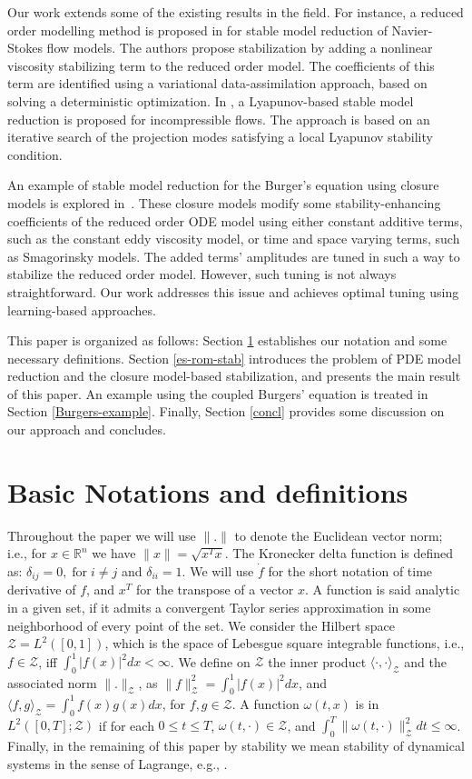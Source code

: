 \documentclass[letterpaper,conference,onecolumn,11pt]{IEEEtran}
\begin{document}
Our work extends some of the existing results in the field. For
instance, a reduced order modelling method is proposed in
\cite{CNTLDBDN13} for stable model reduction of Navier-Stokes flow
models. The authors propose stabilization by adding a nonlinear
viscosity stabilizing term to the reduced order model. The
coefficients of this term are identified using a variational
data-assimilation approach, based on solving a deterministic
optimization. In \cite{BDN13,B13}, a Lyapunov-based stable model
reduction is proposed for incompressible flows. The approach is
based on an iterative search of the projection modes satisfying a
local Lyapunov stability condition.

An example of stable model reduction for the Burger's equation
using closure models is explored in~\cite{SB14,SI13}. These
closure models modify some stability-enhancing coefficients of the
reduced order ODE model using either constant additive terms, such
as the constant eddy viscosity model, or time and space varying
terms, such as Smagorinsky models. The added terms' amplitudes are
tuned in such a way to stabilize the reduced order model. However,
such tuning is not always straightforward. Our work addresses this
issue and achieves optimal tuning using learning-based approaches.

This paper is organized as follows: Section \ref{prem} establishes our
notation and some necessary definitions. Section \ref{es-rom-stab}
introduces the problem of PDE model reduction and the closure
model-based stabilization, and presents the main result of this paper.
An example using the coupled Burgers' equation is treated in Section
\ref{Burgers-example}.  Finally, Section \ref{concl} provides some
discussion on our approach and concludes.

\section{Basic Notations and definitions}
\label{prem}
Throughout the paper we will use $\|.\|$ to denote the Euclidean
vector norm; i.e., for $x\in \mathbb{R}^n$ we have $\|x\|=\sqrt{x^T
  x}$. The Kronecker delta function is defined as:
$\delta_{ij}=0,\;\text{for}\;i\neq j$ and $\delta_{ii}=1$. We will
use $\dot{f}$ for the short notation of time derivative of $f$,
and $x^{T}$ for the transpose of a vector $x$. A function is said
analytic in a given set, if it admits a convergent Taylor series
approximation in some neighborhood of every point of the set. We
consider the Hilbert space $\mathcal{Z}=L^{2}([0,1])$, which is
the space of Lebesgue square integrable functions, i.e.,
$f\in\mathcal{Z}$, iff $\int_{0}^{1}|f(x)|^{2}dx<\infty$. We
define on $\mathcal{Z}$ the inner product $\langle
\cdot,\cdot\rangle _{\mathcal{Z}}$ and the associated norm
$\|.\|_{\mathcal{Z}}$, as
$\|f\|_{\mathcal{Z}}^{2}=\int_{0}^{1}|f(x)|^{2}dx$, and $\langle
f,g\rangle _{\mathcal{Z}}=\int_{0}^{1}f(x)g(x)dx$, for
$f,g\in\mathcal{Z}$. A function $\omega(t,x)$ is in
$L^{2}([0,T];\mathcal{Z})$ if for each $0\leq t\leq T$,
$\omega(t,\cdot)\in\mathcal{Z}$, and
$\int_{0}^{T}{\|\omega(t,\cdot)\|_\mathcal{Z}^2} dt\leq\infty$.
Finally, in the remaining of this paper by stability we mean
stability of dynamical systems in the sense of Lagrange, e.g.,
\cite{haddad2008}.
\end{document}

